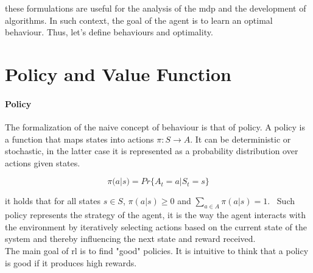 \documentclass[a4paper,11pt]{report}
\theoremstyle{definition}
\theoremstyle{plain}
\theoremstyle{remark}  %
\begin{document}
these formulations are useful for the analysis of the \gls{mdp} and the development of algorithms. 
In such context, the goal of the agent is to learn an optimal behaviour. 
Thus, let's define behaviours and optimality.

\section{Policy and Value Function}
\paragraph{Policy}
The formalization of the naive concept of behaviour is that of policy. A policy is a function that 
maps states into actions $\pi : S \rightarrow A$. It can be deterministic or stochastic, in 
the latter case it is represented as a probability distribution over actions given states.

$$\pi(a|s) = Pr\{A_t = a | S_t = s\}$$

it holds that for all states $s \in S$, $\pi(a|s) \geq 0$ and $\sum_{a \in A} \pi(a|s) = 1$. \
Such policy represents the strategy of the agent, it is the way the agent interacts with the environment
by iteratively selecting actions based on the current state of the system and thereby influencing the next state and 
reward received. \\
The main goal of \gls{rl} is to find "good" policies. It is intuitive to think that a policy is good 
if it produces high rewards.

\end{document}
